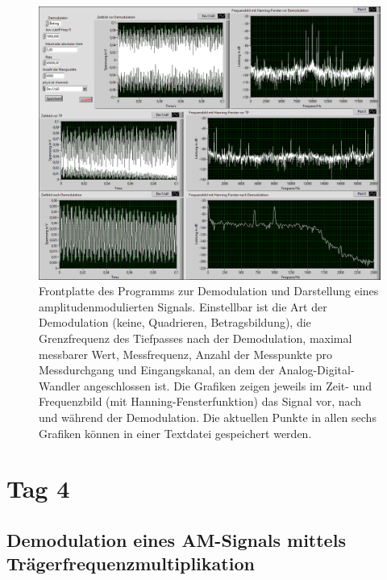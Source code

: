 \documentclass[
a4paper,
12pt,
pagesize,
ngerman
]{scrartcl}
\begin{document}
\begin{figure}[H]  
	\includegraphics[width=1\textwidth]{EIRE2018Dateien/Tag3/modifizierterOszi/Oszilloskop__modifiziertp}
	\centering
	\caption{
		Frontplatte des Programms zur Demodulation und Darstellung eines amplitudenmodulierten Signals.
		Einstellbar ist die Art der Demodulation (keine, Quadrieren, Betragsbildung), die Grenzfrequenz des Tiefpasses nach der Demodulation, maximal messbarer Wert, Messfrequenz, Anzahl der Messpunkte pro Messdurchgang und Eingangskanal, an dem der Analog-Digital-Wandler angeschlossen ist.
		Die Grafiken zeigen jeweils im Zeit- und Frequenzbild (mit Hanning-Fensterfunktion) das Signal vor, nach und während der Demodulation.
		Die aktuellen Punkte in allen sechs Grafiken können in einer Textdatei gespeichert werden.
	}
	\label{fig_tag3_am_demod_front}
	\centering
\end{figure}
	

	\section{Tag 4}
	
	\subsection{Demodulation eines AM-Signals mittels Trägerfrequenzmultiplikation}
		
\end{document}
